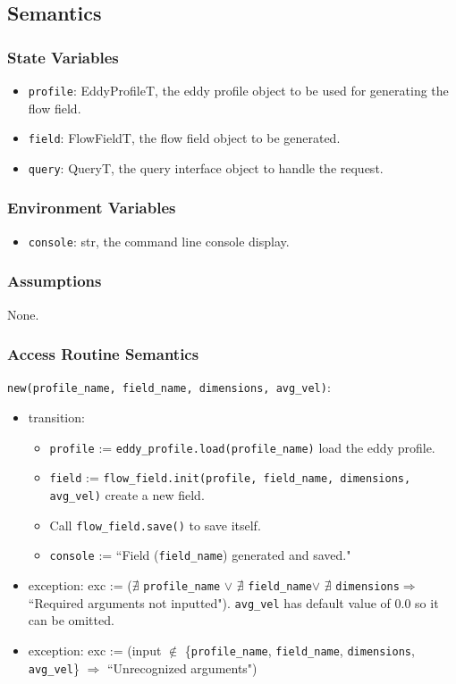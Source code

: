 \documentclass[12pt, titlepage]{article}
\begin{document}
\subsection{Semantics}

\subsubsection{State Variables}
\begin{itemize}
  \item \texttt{profile}: EddyProfileT, the eddy profile object to be used for generating the flow field.
  \item \texttt{field}: FlowFieldT, the flow field object to be generated.
  \item \texttt{query}: QueryT, the query interface object to handle the request.
\end{itemize}

\subsubsection{Environment Variables}
\begin{itemize}
  \item \texttt{console}: str, the command line console display.
\end{itemize}

\subsubsection{Assumptions}
None.

\subsubsection{Access Routine Semantics}

\noindent \texttt{new(profile\_name, field\_name, dimensions, avg\_vel)}:
\begin{itemize}
  \item transition:
  \begin{itemize}
    \item \texttt{profile} := \texttt{eddy\_profile.load(profile\_name)} load the eddy profile.
    \item \texttt{field} := \texttt{flow\_field.init(profile, field\_name, dimensions, avg\_vel)} create a new field.
    \item Call \texttt{flow\_field.save()} to save itself.
    \item \texttt{console} := ``Field (\texttt{field\_name}) generated and saved."
  \end{itemize}
  \item exception: exc := ($\nexists$ \texttt{profile\_name} $\vee$ $\nexists$ \texttt{field\_name}$\vee$ $\nexists$ \texttt{dimensions}$\Rightarrow$ ``Required arguments not inputted"). \texttt{avg\_vel} has default value of 0.0 so it can be omitted.
  \item exception: exc := (input $\notin$ \{\texttt{profile\_name}, \texttt{field\_name}, \texttt{dimensions}, \texttt{avg\_vel}\} $\Rightarrow$ ``Unrecognized arguments")
\end{itemize}
\end{document}
